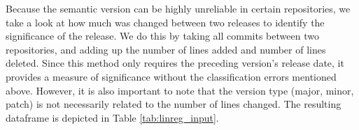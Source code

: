 \begin{table}[!htbp]
    \centering
    \caption{OLS regression input data. (b=before, a=after)}
    \label{tab:linreg_input}
\end{table}

Because the semantic version can be highly unreliable in certain repositories, we take a look at how much was changed between two releases to identify the significance of the release. We do this by taking all commits between two repositories, and adding up the number of lines added and number of lines deleted. Since this method only requires the preceding version's release date, it provides a measure of significance without the classification errors mentioned above. However, it is also important to note that the version type (major, minor, patch) is not necessarily related to the number of lines changed. The resulting dataframe is depicted in Table \ref{tab:linreg_input}.

